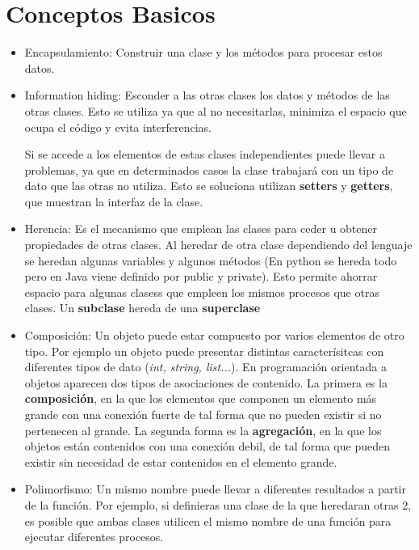 \documentclass[11pt]{article}
\theoremstyle{plain}
\begin{document}
    \section{Conceptos Basicos} %
    \label{sec:conceptos_basicos}
    \begin{itemize}
        \item Encapsulamiento: Construir una clase y los métodos para procesar estos datos.
        \item Information hiding: Esconder a las otras clases los datos y métodos de las otras clases. Esto se utiliza ya que al no necesitarlas, minimiza el espacio que ocupa el código y evita interferencias.

        Si se accede a los elementos de estas clases independientes puede llevar a problemas, ya que en determinados casos la clase trabajará con un tipo de dato que las otras no utiliza. Esto se soluciona utilizan \textbf{setters} y \textbf{getters}, que muestran la interfaz de la clase. 
        \item Herencia: Es el mecanismo que emplean las clases para ceder u obtener propiedades de otras clases. Al heredar de otra clase dependiendo del lenguaje se heredan algunas variables y algunos métodos (En python se hereda todo pero en Java viene definido por public y private). Esto permite ahorrar espacio para algunas clasess que empleen los mismos procesos que otras clases. Un \textbf{subclase} hereda de una \textbf{superclase}
        \item Composición: Un objeto puede estar compuesto por varios elementos de otro tipo. Por ejemplo un objeto puede presentar distintas caracterísitcas con diferentes tipos de dato (\textit{int, string, list...}). En programación orientada a objetos aparecen dos tipos de asociaciones de contenido. La primera es la \textbf{composición}, en la que los elementos que componen un elemento más grande con una conexión fuerte de tal forma que no pueden existir si no pertenecen al grande. La segunda forma es la \textbf{agregación}, en la que los objetos están contenidos con una conexión debil, de tal forma que pueden existir sin necesidad de estar contenidos en el elemento grande.
        \item Polimorfismo: Un mismo nombre puede llevar a diferentes resultados a partir de la función. Por ejemplo, si definieras una clase de la que heredaran otras 2, es posible que ambas clases utilicen el mismo nombre de una función para ejecutar diferentes procesos.
    \end{itemize}
\end{document}
